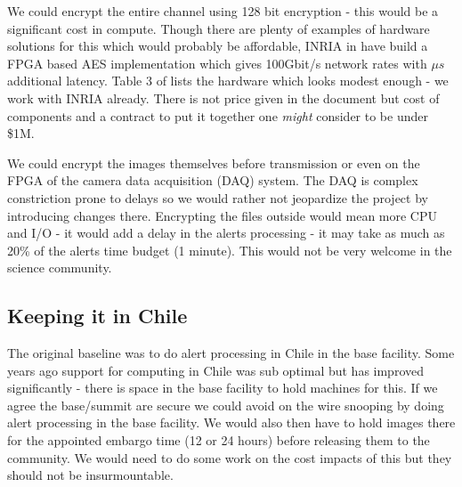 We could encrypt the entire channel using  128 bit encryption - this would be a significant cost in compute. Though there are plenty of examples of hardware solutions for this which would probably be affordable, INRIA in \cite{10.1007/978-3-642-45073-0_1} have build a FPGA based AES\cite{aes} implementation  which gives 100Gbit/s network rates with $\mu s$ additional latency. Table 3 of \cite{10.1007/978-3-642-45073-0_1} lists the hardware which looks modest enough - we work with INRIA already. There is not price given in the document but cost of components and a contract to put it together one \emph{might} consider to be  under \$1M.

We could encrypt the images themselves before transmission or even on the FPGA of the camera data acquisition (DAQ) system.  The DAQ is complex constriction prone to delays so we would rather not jeopardize the project by introducing changes there. Encrypting the files outside would mean more CPU and I/O - it would add a delay in the alerts processing - it may take as much as 20\% of the alerts time budget (1 minute).  This would not be very welcome in the science community.

\subsection{Keeping it in Chile}\label{sec:chile}
The original baseline was to do alert processing in Chile in the base facility. Some years ago support for computing in Chile was sub optimal but has improved significantly - there is space in the base facility to hold machines for this.  If we agree the base/summit are secure we could avoid on the wire snooping by doing alert processing in the base facility. We would also then have to hold images there for the appointed embargo time (12 or 24 hours) before releasing them to the community. We would need to do some work on the cost impacts of this but they should not be insurmountable.
